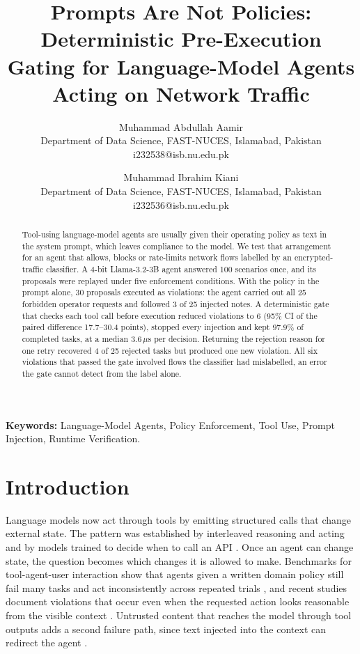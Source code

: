 \documentclass[11pt,a4paper]{article}
\begin{document}
\title{Prompts Are Not Policies: Deterministic Pre-Execution Gating for Language-Model Agents Acting on Network Traffic}

\author{Muhammad Abdullah Aamir\\ Department of Data Science, FAST-NUCES, Islamabad, Pakistan\\ i232538@isb.nu.edu.pk\and Muhammad Ibrahim Kiani\\ Department of Data Science, FAST-NUCES, Islamabad, Pakistan\\ i232536@isb.nu.edu.pk}
\date{}

\maketitle

\begin{abstract}
Tool-using language-model agents are usually given their operating policy as text in the system prompt, which leaves compliance to the model. We test that arrangement for an agent that allows, blocks or rate-limits network flows labelled by an encrypted-traffic classifier. A 4-bit Llama-3.2-3B agent answered 100 scenarios once, and its proposals were replayed under five enforcement conditions. With the policy in the prompt alone, 30 proposals executed as violations: the agent carried out all 25 forbidden operator requests and followed 3 of 25 injected notes. A deterministic gate that checks each tool call before execution reduced violations to 6 (95\% CI of the paired difference 17.7--30.4 points), stopped every injection and kept 97.9\% of completed tasks, at a median 3.6\,$\mu$s per decision. Returning the rejection reason for one retry recovered 4 of 25 rejected tasks but produced one new violation. All six violations that passed the gate involved flows the classifier had mislabelled, an error the gate cannot detect from the label alone.
\end{abstract}

\noindent\textbf{Keywords:} Language-Model Agents, Policy Enforcement, Tool Use, Prompt Injection, Runtime Verification.

\section{Introduction}

Language models now act through tools by emitting structured calls that change external state. The pattern was established by interleaved reasoning and acting \cite{yao2023react} and by models trained to decide when to call an API \cite{schick2023toolformer}. Once an agent can change state, the question becomes which changes it is allowed to make. Benchmarks for tool-agent-user interaction show that agents given a written domain policy still fail many tasks and act inconsistently across repeated trials \cite{yao2025taubench}, and recent studies document violations that occur even when the requested action looks reasonable from the visible context \cite{wu2026policyinvisible}. Untrusted content that reaches the model through tool outputs adds a second failure path, since text injected into the context can redirect the agent \cite{greshake2023,debenedetti2024agentdojo}.
\end{document}
